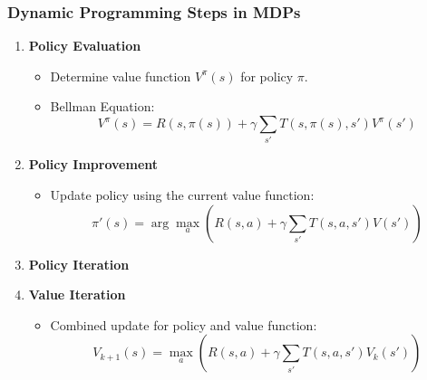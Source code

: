 \documentclass[aspectratio=169]{beamer}
\begin{document}
\begin{frame}[fragile]
    \frametitle{Dynamic Programming Steps in MDPs}
    \begin{enumerate}
        \item \textbf{Policy Evaluation}
            \begin{itemize}
                \item Determine value function $V^\pi(s)$ for policy $\pi$.
                \item Bellman Equation: 
                \[
                V^\pi(s) = R(s, \pi(s)) + \gamma \sum_{s'} T(s, \pi(s), s') V^\pi(s')
                \]
            \end{itemize}

        \item \textbf{Policy Improvement}
            \begin{itemize}
                \item Update policy using the current value function:
                \[
                \pi'(s) = \arg\max_a \left( R(s, a) + \gamma \sum_{s'} T(s, a, s') V(s') \right)
                \]
            \end{itemize}

        \item \textbf{Policy Iteration}
        \item \textbf{Value Iteration}
            \begin{itemize}
                \item Combined update for policy and value function:
                \[
                V_{k+1}(s) = \max_a \left( R(s, a) + \gamma \sum_{s'} T(s, a, s') V_k(s') \right)
                \]
            \end{itemize}
    \end{enumerate}
\end{frame}
\end{document}
